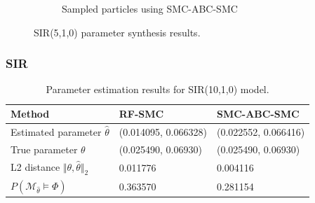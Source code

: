 \documentclass{beamer}
\begin{document}
\begin{frame}
\begin{figure}[H]
\begin{subfigure}{0.4\textwidth}
            \caption{Sampled particles using SMC-ABC-SMC}
        \end{subfigure}
        \caption{SIR(5,1,0) parameter synthesis results.}
    \end{figure}
\end{frame}


\begin{frame}
    \frametitle{SIR}
    \begin{table}[H]
        \begin{tabular}{|l|l|l|}
            \hline
            Method                                           & RF-SMC               & SMC-ABC-SMC          \\ \hline
            Estimated parameter $\hat{\theta}$               & (0.014095, 0.066328) & (0.022552, 0.066416) \\ \hline
            True parameter $\theta$                          & (0.025490, 0.06930)  & (0.025490, 0.06930)  \\ \hline
            L2 distance $\Vert \theta, \hat{\theta} \Vert_2$ & 0.011776             & 0.004116             \\ \hline
            $P(\mathcal{M}_{\hat{\theta}}\models\Phi)$       & 0.363570             & 0.281154             \\ \hline
        \end{tabular}
        \caption{Parameter estimation results for SIR(10,1,0) model.}
    \end{table}
\end{frame}
\end{document}
